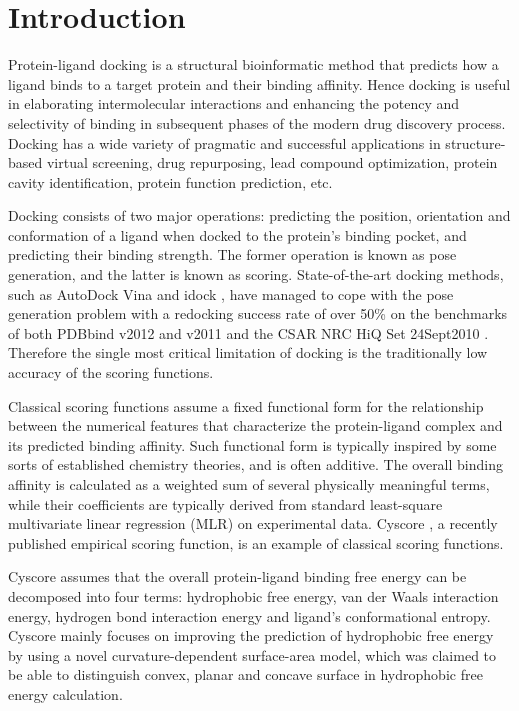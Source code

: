 \documentclass[10pt,conference,compsocconf]{IEEEtran}
\begin{document}
\section{Introduction}

Protein-ligand docking is a structural bioinformatic method that predicts how a ligand binds to a target protein and their binding affinity. Hence docking is useful in elaborating intermolecular interactions and enhancing the potency and selectivity of binding in subsequent phases of the modern drug discovery process. Docking has a wide variety of pragmatic and successful applications in structure-based virtual screening, drug repurposing, lead compound optimization, protein cavity identification, protein function prediction, etc.

Docking consists of two major operations: predicting the position, orientation and conformation of a ligand when docked to the protein's binding pocket, and predicting their binding strength. The former operation is known as pose generation, and the latter is known as scoring. State-of-the-art docking methods, such as AutoDock Vina \cite{595} and idock \cite{1153}, have managed to cope with the pose generation problem with a redocking success rate of over 50\% \cite{1362} on the benchmarks of both PDBbind v2012 and v2011 \cite{529,530} and the CSAR NRC HiQ Set 24Sept2010 \cite{857,960}. Therefore the single most critical limitation of docking is the traditionally low accuracy of the scoring functions.

Classical scoring functions assume a fixed functional form for the relationship between the numerical features that characterize the protein-ligand complex and its predicted binding affinity. Such functional form is typically inspired by some sorts of established chemistry theories, and is often additive. The overall binding affinity is calculated as a weighted sum of several physically meaningful terms, while their coefficients are typically derived from standard least-square multivariate linear regression (MLR) on experimental data. Cyscore \cite{1372}, a recently published empirical scoring function, is an example of classical scoring functions.

Cyscore assumes that the overall protein-ligand binding free energy can be decomposed into four terms: hydrophobic free energy, van der Waals interaction energy, hydrogen bond interaction energy and ligand's conformational entropy. Cyscore mainly focuses on improving the prediction of hydrophobic free energy by using a novel curvature-dependent surface-area model, which was claimed to be able to distinguish convex, planar and concave surface in hydrophobic free energy calculation.
\end{document}
